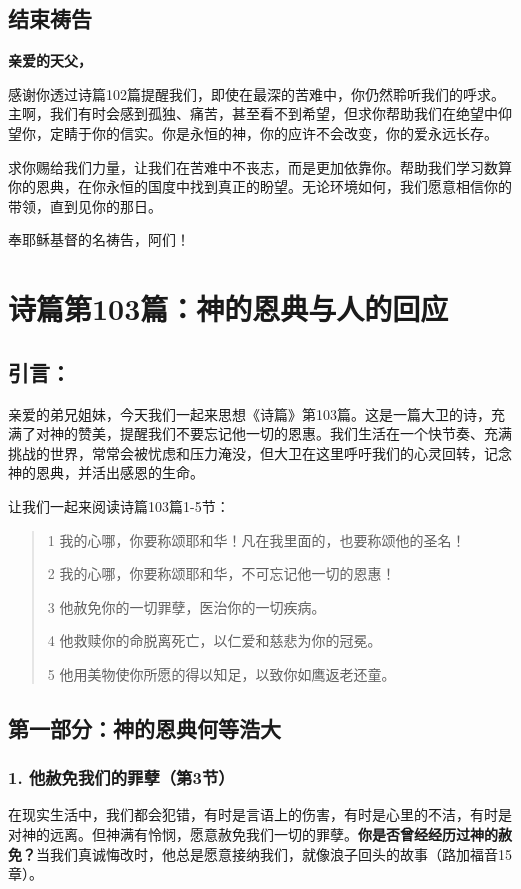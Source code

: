 \documentclass[a4paper, 12pt]{article}
\begin{document}
\subsection*{结束祷告}
\textbf{亲爱的天父，}

感谢你透过诗篇102篇提醒我们，即使在最深的苦难中，你仍然聆听我们的呼求。主啊，我们有时会感到孤独、痛苦，甚至看不到希望，但求你帮助我们在绝望中仰望你，定睛于你的信实。你是永恒的神，你的应许不会改变，你的爱永远长存。

求你赐给我们力量，让我们在苦难中不丧志，而是更加依靠你。帮助我们学习数算你的恩典，在你永恒的国度中找到真正的盼望。无论环境如何，我们愿意相信你的带领，直到见你的那日。

奉耶稣基督的名祷告，阿们！
\newpage
\section{诗篇第103篇：神的恩典与人的回应}
\subsection*{引言：}
\hspace{0.6cm}亲爱的弟兄姐妹，今天我们一起来思想《诗篇》第103篇。这是一篇大卫的诗，充满了对神的赞美，提醒我们不要忘记他一切的恩惠。我们生活在一个快节奏、充满挑战的世界，常常会被忧虑和压力淹没，但大卫在这里呼吁我们的心灵回转，记念神的恩典，并活出感恩的生命。

让我们一起来阅读诗篇103篇1-5节：
\begin{quote}
    1 我的心哪，你要称颂耶和华！凡在我里面的，也要称颂他的圣名！
    
    2 我的心哪，你要称颂耶和华，不可忘记他一切的恩惠！
    
    3 他赦免你的一切罪孽，医治你的一切疾病。
    
    4 他救赎你的命脱离死亡，以仁爱和慈悲为你的冠冕。
    
    5 他用美物使你所愿的得以知足，以致你如鹰返老还童。
\end{quote}


\subsection*{第一部分：神的恩典何等浩大}

\subsubsection*{1. 他赦免我们的罪孽（第3节）}
在现实生活中，我们都会犯错，有时是言语上的伤害，有时是心里的不洁，有时是对神的远离。但神满有怜悯，愿意赦免我们一切的罪孽。\textbf{你是否曾经经历过神的赦免？}当我们真诚悔改时，他总是愿意接纳我们，就像浪子回头的故事（路加福音15章）。
\end{document}

